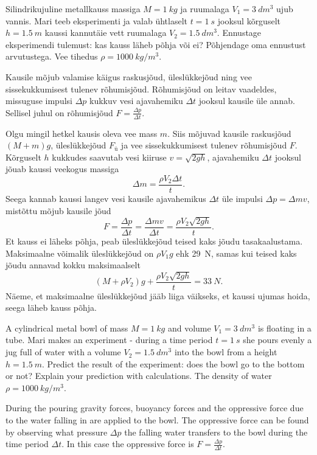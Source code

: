 
Silindrikujuline metallkauss massiga $M=\SI{1}{kg}$ ja ruumalaga
$V_1=\SI{3}{dm^3}$ ujub vannis. Mari teeb eksperimenti ja valab ühtlaselt
$t=\SI{1}{s}$ jooksul kõrguselt $h=\SI{1,5}{m}$ kaussi kannutäie vett ruumalaga
$V_2=\SI{1,5}{dm^3}$. Ennustage eksperimendi tulemust: kas kauss läheb põhja või
ei? Põhjendage oma ennustust arvutustega. Vee tihedus $\rho=\SI{1000}{kg/m^3}$.

\hint
Kausile mõjub valamise käigus raskusjõud, üleslükkejõud ning vee sissekukkumisest tulenev rõhumisjõud. Rõhumisjõud on leitav vaadeldes, missuguse impulsi $\Delta p$ kukkuv vesi ajavahemiku $\Delta t$ jooksul kausile üle annab. Sellisel juhul on rõhumisjõud $F = \frac{\Delta p}{\Delta t}$.

\solu
Olgu mingil hetkel kausis oleva vee mass $m$. Siis mõjuvad kausile raskusjõud $(M+m)g$, üleslükkejõud $F_{ü}$ ja vee sissekukkumisest tulenev rõhumisjõud $F$. Kõrguselt $h$ kukkudes saavutab vesi kiiruse $v=\sqrt{2gh}$, ajavahemiku $\Delta t$ jooksul jõuab kaussi veekogus massiga
\[
\Delta m = \frac{\rho V_2 \Delta t}{t}.
\]
Seega kannab kaussi langev vesi kausile ajavahemikus $\Delta t$ üle impulsi $\Delta p =\Delta m v$, mistõttu mõjub kausile jõud
\[
F=\frac{\Delta p}{\Delta t}=\frac{\Delta m v}{\Delta t}=\frac{\rho V_2 \sqrt{2gh}}{t}.
\]
Et kauss ei läheks põhja, peab üleslükkejõud teised kaks jõudu tasakaalustama. Maksimaalne võimalik üleslükkejõud on $\rho V_1 g$ ehk \SI{29}{N}, samas kui teised kaks jõudu annavad kokku maksimaalselt
\[
(M+\rho V_2)g + \frac{\rho V_2 \sqrt{2gh}}{t} = \SI{33}{N}.
\]
Näeme, et maksimaalne üleslükkejõud jääb liiga väikseks, et kaussi ujumas hoida, seega läheb kauss põhja.

A cylindrical metal bowl of mass $M=\SI{1}{kg}$ and volume $V_1=\SI{3}{dm^3}$ is floating in a tube. Mari makes an experiment - during a time period $t=\SI{1}{s}$ she pours evenly a jug full of water with a volume $V_2=\SI{1,5}{dm^3}$ into the bowl from a height $h=\SI{1,5}{m}$. Predict the result of the experiment: does the bowl go to the bottom or not? Explain your prediction with calculations. The density of water $\rho=\SI{1000}{kg/m^3}$.

\hinteng
During the pouring gravity forces, buoyancy forces and the oppressive force due to the water falling in are applied to the bowl. The oppressive force can be found by observing what pressure $\Delta p$ the falling water transfers to the bowl during the time period $\Delta t$. In this case the oppressive force is $F = \frac{\Delta p}{\Delta t}$.

